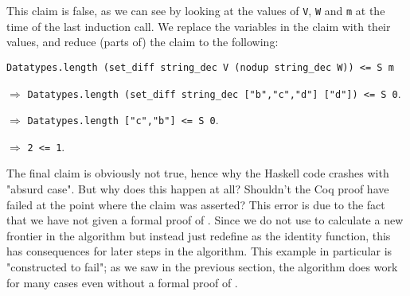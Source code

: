 This claim is false, as we can see by looking at the values of
\lstinline{V}, \lstinline{W} and \lstinline{m} at the time of the last induction call.
We replace the variables in the claim with their values, and reduce (parts of) the claim to the following:

\tabto{2em}
\lstinline{Datatypes.length (set_diff string_dec V (nodup string_dec W)) <= S m}

$\Rightarrow$
\tabto{2em}
\lstinline{Datatypes.length (set_diff string_dec ["b","c","d"] ["d"]) <= S 0}.

$\Rightarrow$
\tabto{2em}
\lstinline{Datatypes.length ["c","b"] <= S 0}.

$\Rightarrow$
\tabto{2em}
\lstinline{2 <= 1}.

The final claim is obviously not true, hence why the Haskell code crashes with "absurd case".
But why does this happen at all? Shouldn't the Coq proof have failed at the point where the claim was asserted?
This error is due to the fact that we have not given a formal proof of .
Since we do not use  to calculate a new frontier in the algorithm but instead just
redefine  as the identity function, this has consequences for later steps in the algorithm.
This example in particular is "constructed to fail"; as we saw in the previous section,
the algorithm does work for many cases even without a formal proof of .
